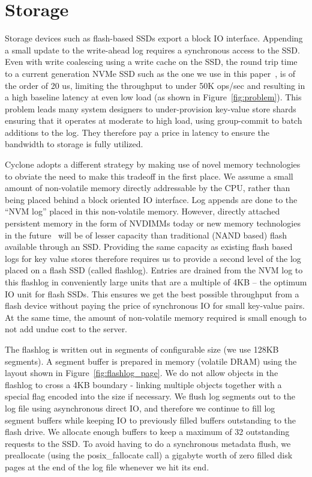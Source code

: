 \documentclass[pageno]{jpaper}
\begin{document}
\section{Storage}
\label{sec:storage}
Storage devices such as flash-based SSDs export a block IO interface. Appending
a small update to the write-ahead log requires a synchronous access to the
SSD. Even with write coalescing using a write cache on the SSD, the round trip
time to a current generation NVMe SSD such as the one we use in this
paper~\cite{ssd_spec}, is of the order of 20 us, limiting the throughput to
under 50K ops/sec and resulting in a high baseline latency at even low load (as
shown in Figure~\ref{fig:problem}). This problem leads many system designers to
under-provision key-value store shards ensuring that it operates at moderate to
high load, using group-commit to batch additions to the log. They therefore pay
a price in latency to ensure the bandwidth to storage is fully utilized.

Cyclone adopts a different strategy by making use of novel memory technologies
to obviate the need to make this tradeoff in the first place. We assume a small
amount of non-volatile memory directly addressable by the CPU, rather than being
placed behind a block oriented IO interface. Log appends are done to the ``NVM
log'' placed in this non-volatile memory. However, directly attached persistent 
memory in the form of NVDIMMs today or new memory technologies in the
future~\cite{pmfs} will be of lesser capacity than traditional (NAND based)
flash available through an
SSD. Providing the same capacity as existing flash based logs for key value
stores therefore requires us to provide a second level of the log
placed on a flash SSD (called flashlog).  Entries are drained from
the NVM log to this flashlog in conveniently large units that are a multiple of
4KB -- the optimum IO unit for flash SSDs. This ensures we get the best possible
throughput from a flash device without paying the price of synchronous IO for
small key-value pairs. At the same time, the amount of non-volatile memory
required is small enough to not add undue cost to the server.

The flashlog is written out in segments of configurable size (we use 128KB
segments). A segment buffer is prepared in memory (volatile DRAM) using the
layout shown in Figure~\ref{fig:flashlog_page}. We do not allow objects in the
flashlog to cross a 4KB boundary - linking multiple objects together with a
special flag encoded into the size if necessary. We flush log segments out to
the log file using asynchronous direct IO, and therefore we continue to fill log
segment buffers while keeping IO to previously filled buffers outstanding to the
flash drive. We allocate enough buffers to keep a maximum of 32 outstanding
requests to the SSD. To avoid having to do a synchronous metadata flush, we
preallocate (using the posix\_fallocate call) a gigabyte worth of zero filled
disk pages at the end of the log file whenever we hit its end.
\end{document}
